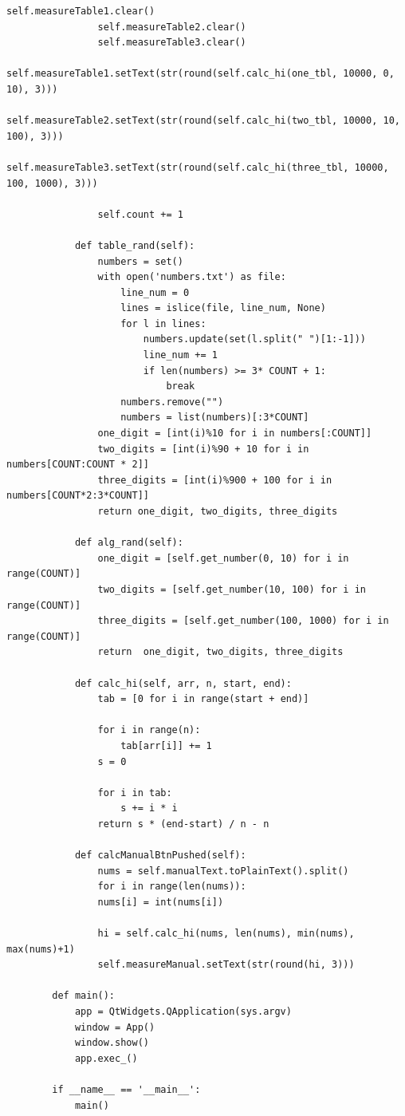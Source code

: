 \documentclass[14pt, a4paper]{extarticle}
\begin{document}
\begin{lstlisting}[caption=lab3.py]
				self.measureTable1.clear()
				self.measureTable2.clear()
				self.measureTable3.clear()
				self.measureTable1.setText(str(round(self.calc_hi(one_tbl, 10000, 0, 10), 3)))
				self.measureTable2.setText(str(round(self.calc_hi(two_tbl, 10000, 10, 100), 3)))
				self.measureTable3.setText(str(round(self.calc_hi(three_tbl, 10000, 100, 1000), 3)))
				
				self.count += 1
			
			def table_rand(self):
				numbers = set()
				with open('numbers.txt') as file: 
					line_num = 0
					lines = islice(file, line_num, None)
					for l in lines:
						numbers.update(set(l.split(" ")[1:-1]))
						line_num += 1
						if len(numbers) >= 3* COUNT + 1:
							break
					numbers.remove("") 
					numbers = list(numbers)[:3*COUNT]
				one_digit = [int(i)%10 for i in numbers[:COUNT]]
				two_digits = [int(i)%90 + 10 for i in numbers[COUNT:COUNT * 2]]
				three_digits = [int(i)%900 + 100 for i in numbers[COUNT*2:3*COUNT]]
				return one_digit, two_digits, three_digits
			
			def alg_rand(self):
				one_digit = [self.get_number(0, 10) for i in range(COUNT)]
				two_digits = [self.get_number(10, 100) for i in range(COUNT)]
				three_digits = [self.get_number(100, 1000) for i in range(COUNT)]
				return  one_digit, two_digits, three_digits
			
			def calc_hi(self, arr, n, start, end): 
				tab = [0 for i in range(start + end)]
			
				for i in range(n):
					tab[arr[i]] += 1
				s = 0
				
				for i in tab:
					s += i * i				
				return s * (end-start) / n - n 
			
			def calcManualBtnPushed(self):
				nums = self.manualText.toPlainText().split()
				for i in range(len(nums)):
				nums[i] = int(nums[i])
				
				hi = self.calc_hi(nums, len(nums), min(nums), max(nums)+1)
				self.measureManual.setText(str(round(hi, 3)))
			
		def main():
			app = QtWidgets.QApplication(sys.argv)
			window = App()
			window.show()
			app.exec_()
		
		if __name__ == '__main__':
			main()		
	\end{lstlisting}	
\end{document}

